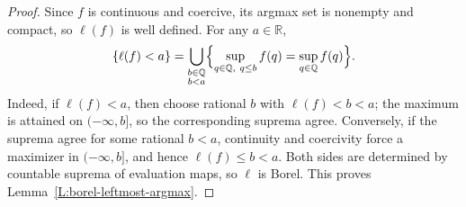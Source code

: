 \documentclass[10pt,a4paper]{amsart}
\newcommand{\R}{\mathbb{R}}
\begin{document}
\begin{proof}
  Since $f$ is continuous and coercive, its argmax set is nonempty and compact,
  so $\ell(f)$ is well defined. For any $a \in \R$,
  \[
    \{\ell(f)<a\}
    =
    \bigcup_{\substack{b\in\mathbb{Q}\\ b<a}}
    \Bigl\{\sup_{q\in\mathbb{Q},\ q\le b} f(q)
    =\sup_{q\in\mathbb{Q}} f(q)\Bigr\}.
  \]
  Indeed, if $\ell(f)<a$, then choose rational $b$ with $\ell(f)<b<a$; the
  maximum is attained on $(-\infty,b]$, so the corresponding suprema agree.
  Conversely, if the suprema agree for some rational $b<a$, continuity and
  coercivity force a maximizer in $(-\infty,b]$, and hence $\ell(f)\le b<a$.
  Both sides are determined by countable suprema of evaluation maps, so $\ell$
  is Borel.  This proves Lemma~\ref{L:borel-leftmost-argmax}.
\end{proof}
\end{document}
